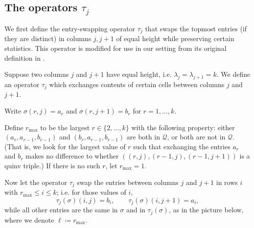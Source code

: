 \documentclass[ALCO,Unicode]{cedram}
\newcommand{\cQ}{\mathcal{Q}}
\begin{document}
\subsection{The operators $\tau_j$}

We first define the entry-swapping operator $\tau_j$ that swaps the topmost entries (if they are distinct) in columns $j,j+1$ of equal height while preserving certain statistics. This operator is modified for use in our setting from its original definition in \cite{LoehrNiese}.

\begin{defn}\label{def:tau}

Suppose two columns $j$ and $j+1$ have equal height, i.e.
$\lambda_j=\lambda_{j+1}=k$. We define an operator $\tau_j$ which
exchanges contents of certain cells between columns $j$ and $j+1$. 

Write $\sigma(r,j)=a_r$ and $\sigma(r,j+1)=b_r$ for $r=1,\dots, k$. 

Define $r_{\max}$ to be the largest $r\in\{2,\dots,k\}$ with the following property:
either $(a_r, a_{r-1}, b_{r-1})$ and $(b_r, a_{r-1}, b_{r-1})$ are both in $\cQ$,
or both are not in $\cQ$. \textup{(}That is, we look for the largest value of $r$ 
such that exchanging the entries $a_r$ and $b_r$
makes no difference to whether $((r,j), (r-1,j), (r-1, j+1))$ is a quinv triple.\textup{)}
If there is no such $r$, let $r_{\max}=1$. 

Now let the operator $\tau_j$ swap the entries between columns $j$ and $j+1$
in rows $i$ with $r_{\max}\leq i\leq k$; i.e. for those values of $i$,
\[
\tau_j(\sigma)(i,j)=b_i,
\qquad 
\tau_j(\sigma)(i,j+1)=a_i,
\]
while all other entries are the same in $\sigma$ and in $\tau_j(\sigma)$,
as in the picture below, where we denote $\ell\coloneqq r_{\max}$.



\end{defn}
\end{document}
